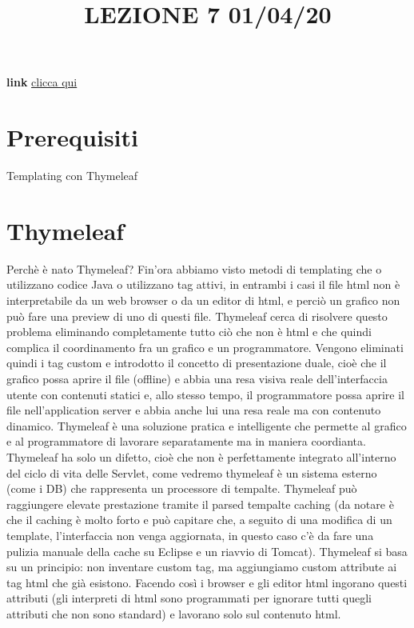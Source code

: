 \title{LEZIONE 7 01/04/20}\newline
\textbf{link} \href{}{clicca qui}
\section*{Prerequisiti}
Templating con Thymeleaf
\section{Thymeleaf}
Perchè è nato Thymeleaf? Fin'ora abbiamo visto metodi di templating che o utilizzano codice Java o utilizzano tag attivi, in entrambi i casi il file html non è interpretabile da un web browser o da un editor di html, e perciò un grafico non può fare una preview di uno di questi file. Thymeleaf cerca di risolvere questo problema eliminando completamente tutto ciò che non è html e che quindi complica il coordinamento fra un grafico e un programmatore.\newline
Vengono eliminati quindi i tag custom e introdotto il concetto di presentazione duale, cioè che il grafico possa aprire il file (offline) e abbia una resa visiva reale dell'interfaccia utente con contenuti statici e, allo stesso tempo, il programmatore possa aprire il file nell'application server e abbia anche lui una resa reale ma con contenuto dinamico.\newline
\newline
Thymeleaf è una soluzione pratica e intelligente che permette al grafico e al programmatore di lavorare separatamente ma in maniera coordianta.\newline
\newline
Thymeleaf ha solo un difetto, cioè che non è perfettamente integrato all'interno del ciclo di vita delle Servlet, come vedremo thymeleaf è un sistema esterno (come i DB) che rappresenta un processore di tempalte.\newline
\newline
Thymeleaf può raggiungere elevate prestazione tramite il parsed tempalte caching (da notare è che il caching è molto forto e può capitare che, a seguito di una modifica di un template, l'interfaccia non venga aggiornata, in questo caso c'è da fare una pulizia manuale della cache su Eclipse e un riavvio di Tomcat).\newline
\newline
Thymeleaf si basa su un principio: non inventare custom tag, ma aggiungiamo custom attribute ai tag html che già esistono. Facendo così i browser e gli editor html ingorano questi attributi (gli interpreti di html sono programmati per ignorare tutti quegli attributi che non sono standard) e lavorano solo sul contenuto html.\newline
